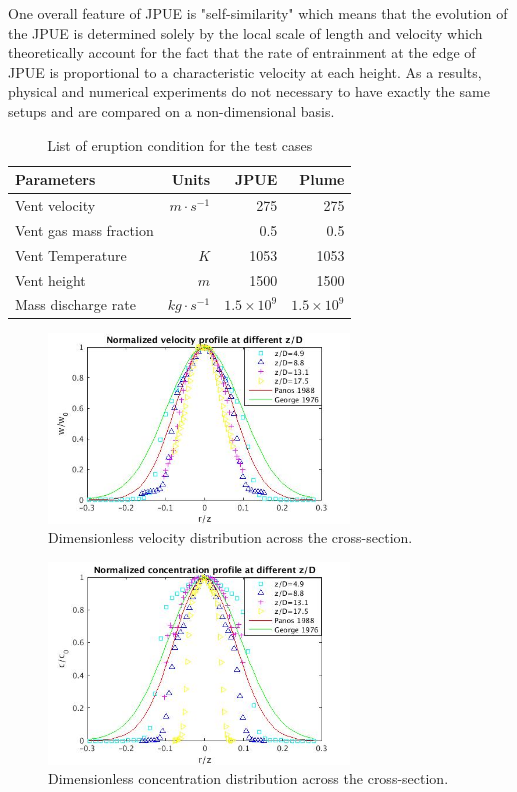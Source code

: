 \documentclass[journal abbreviation, manuscript]{copernicus}
\begin{document}
One overall feature of JPUE is "self-similarity" which means that the evolution of the JPUE is determined solely by the local scale of length and velocity which theoretically account for the fact that the rate of entrainment at the edge of JPUE is proportional to a characteristic velocity at each height. As a results, physical and numerical experiments do not necessary to have exactly the same setups and are compared on a non-dimensional basis.

\begin{table}[htp]
	\begin{centering}
      \caption{List of eruption condition for the test cases}		
	  \begin{tabular}{lrrr}
	    \hline
	    Parameters & Units  & JPUE & Plume \\
	    \hline
	    Vent velocity          & $m\cdot s^{-1}$  & 275               & 275 \\
	    Vent gas mass fraction &             & 0.5               & 0.5 \\
	    Vent Temperature       & $K$         & 1053              & 1053 \\
	    Vent height            & $m$         & 1500              & 1500 \\
	    Mass discharge rate    & $kg\cdot s^{-1}$ & $1.5 \times 10^9$ & $1.5 \times 10^9$\\
	    \hline
	  \end{tabular}
	  \label{tab:input_parameters}
	\end{centering}
\end{table}

\begin{figure}
\includegraphics[width=8cm]{vel_cross}
\caption{Dimensionless velocity distribution across the cross-section.}
\label{fig:JPUE_cross-section_vel}
\end{figure}
\begin{figure}
\includegraphics[width=8cm]{conc_cross}
\caption{Dimensionless concentration distribution across the cross-section.}
\label{fig:JPUE_cross-section_conc}
\end{figure}
\end{document}
